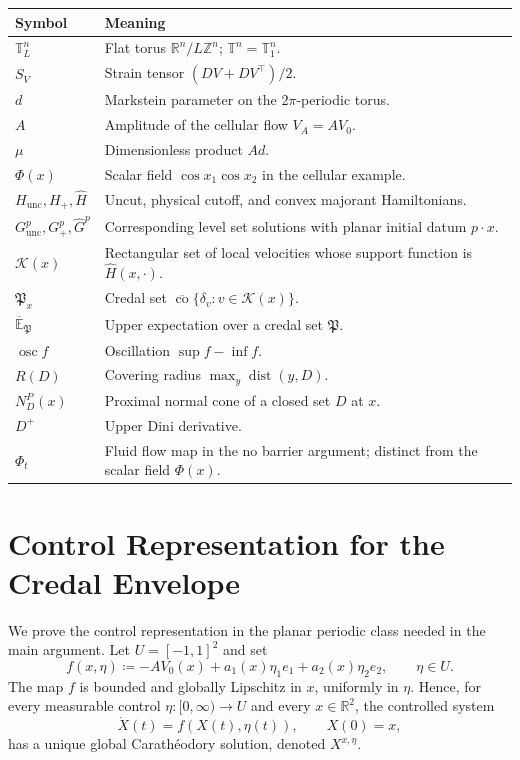 \documentclass[11pt,reqno,noamsfonts]{amsart}
\theoremstyle{definition}
\theoremstyle{remark}
\newcommand{\R}{\mathbb R}
\newcommand{\T}{\mathbb T}
\newcommand{\dist}{\operatorname{dist}}
\newcommand{\osc}{\operatorname{osc}}
\newcommand{\clco}{\overline{\operatorname{co}}}
\newcommand{\Hunc}{H_{\mathrm{unc}}}
\newcommand{\Hcut}{H_{+}}
\newcommand{\Hhat}{\widehat H}
\newcommand{\upperE}{\overline{\mathbb E}}
\begin{document}
\begin{center}
\begin{tabular}{@{}p{}p{}@{}}
\toprule
Symbol & Meaning \\
\midrule
$\T_L^n$ & Flat torus $\R^n/L\mathbb Z^n$; $\T^n=\T_1^n$. \\
$S_V$ & Strain tensor $(DV+DV^\top )/2$. \\
$d$ & Markstein parameter on the $2\pi$-periodic torus. \\
$A$ & Amplitude of the cellular flow $V_A=A V_0$. \\
$\mu$ & Dimensionless product $Ad$. \\
$\Phi(x)$ & Scalar field $\cos x_1\cos x_2$ in the cellular example. \\
$\Hunc,\Hcut,\Hhat$ & Uncut, physical cutoff, and convex majorant Hamiltonians. \\
$G_{\mathrm{unc}}^p,G_+^p,\widehat G^p$
& Corresponding level set solutions with planar initial datum
$p\cdot x$. \\
$\mathcal K(x)$ & Rectangular set of local velocities whose support function is $\Hhat(x,\cdot)$. \\
$\mathfrak P_x$ & Credal set $\clco\{\delta_v:v\in\mathcal K(x)\}$. \\
$\upperE_{\mathfrak P}$ & Upper expectation over a credal set $\mathfrak P$. \\
$\osc f$ & Oscillation $\sup f-\inf f$. \\
$R(D)$ & Covering radius $\max_y\dist(y,D)$. \\
$N_D^P(x)$ & Proximal normal cone of a closed set $D$ at $x$. \\
$D^+$ & Upper Dini derivative. \\
$\Phi_t$ & Fluid flow map in the no barrier argument; distinct from the scalar field $\Phi(x)$. \\
\bottomrule
\end{tabular}
\end{center}


\section{Control Representation for the Credal Envelope}
\label{app:control}

We prove the control representation in the planar periodic class needed
in the main argument. Let
  $U=[-1,1]^2$
and set
\[
  f(x,\eta)
  \coloneqq 
  -A V_0(x)
  +a_1(x)\eta_1e_1
  +a_2(x)\eta_2e_2,
  \qquad \eta\in U.
\]
The map $f$ is bounded and globally Lipschitz in $x$, uniformly in
$\eta$. Hence, for every measurable control
$\eta:[0,\infty)\to U$ and every $x\in\mathbb R^2$, the controlled
system
\[
  \dot X(t)=f(X(t),\eta(t)),
  \qquad X(0)=x,
\]
has a unique global Carath\'eodory solution, denoted
$X^{x,\eta}$.
\end{document}
